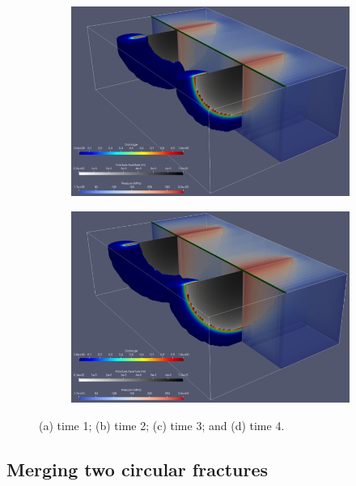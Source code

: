 \begin{figure}[h]
\bigskip
\begin{subfigure}{.45\textwidth}
  \centering
  \includegraphics[width=\linewidth]{Chapter4/figures/3D/t_60.png}
  \caption{}
  \label{fig:parallel_t_2}
\end{subfigure}
\hspace{0.85cm}
\begin{subfigure}{.45\textwidth}
  \centering
  \includegraphics[width=\linewidth]{Chapter4/figures/3D/t_90.png}
  \caption{}
  \label{fig:parallel_t_3}
\end{subfigure}
  \caption{(a) time 1; (b) time 2; (c) time 3; and (d) time 4. } 
  \label{fig:parallel_snapshots}
\end{figure}

\FloatBarrier

\subsection{Merging two circular fractures}

